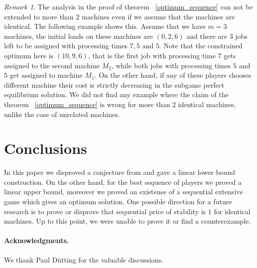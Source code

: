\documentclass[12pt,a4paper]{article}
\theoremstyle{definition}
\theoremstyle{remark}
\newtheorem{remark}[lemma]{Remark}
\begin{document}
\begin{remark}
The analysis in the proof of theorem ~\ref{optimum_sequence} can not be extended to more than $2$ machines even if we assume that the machines are identical. The following example shows this. Assume that we have $m=3$ machines, the initial loads on these machines are $(0,2,6)$ and there are $3$ jobs left to be assigned with processing times $7, 5$ and $5$. Note that the constrained optimum here is $(10, 9, 6)$, that is the first job with processing time $7$ gets assigned to the second machine $M_2$, while both jobs with processing times $5$ and $5$ get assigned to machine $M_1$. On the other hand, if any of these players chooses different machine their cost is strictly decreasing in the subgame perfect equilibrium solution. We did not find any example where the claim of the theorem ~\ref{optimum_sequence} is wrong for more than $2$ identical machines, unlike the case of unrelated machines.      
\end{remark}




\section{Conclusions}\label{sec:conclusion}

In this paper we disproved a conjecture from \cite{Hassin} and gave a linear lower bound construction. On the other hand, for the best sequence of players we proved a linear upper bound, moreover we proved an existense of a sequential extensive game which gives an optimum solution. One possible direction for a future research is to prove or disprove that sequential price of stability is $1$ for identical machines. Up to this point, we were unable to prove it or find a counterexample. 


\paragraph{Acknowledgments.} We thank Paul D\"{u}tting for the valuable discussions. 


 

\end{document}

